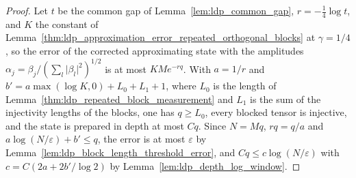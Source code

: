 \begin{proof}
    \leanok
    Let $t$ be the common gap of Lemma~\ref{lem:ldp_common_gap}, $r=-\tfrac14\log t$,
    and $K$ the constant of
    Lemma~\ref{thm:ldp_approximation_error_repeated_orthogonal_blocks} at
    $\gamma=1/4$, so the error of the corrected approximating state with the
    amplitudes $\alpha_j=\beta_j/(\sum_l\lvert\beta_l\rvert^2)^{1/2}$ is at most
    $KMe^{-rq}$. With $a=1/r$ and $b'=a\max(\log K,0)+L_0+L_1+1$, where $L_0$ is the
    length of Lemma~\ref{thm:ldp_repeated_block_measurement} and $L_1$ is the sum
    of the injectivity lengths of the blocks, one has $q\geq L_0$, every blocked
    tensor is injective, and the state is prepared in depth at most $Cq$. Since
    $N=Mq$, $rq=q/a$ and $a\log(N/\varepsilon)+b'\leq q$, the error is at most
    $\varepsilon$ by Lemma~\ref{lem:ldp_block_length_threshold_error}, and
    $Cq\leq c\log(N/\varepsilon)$ with $c=C(2a+2b'/\log2)$ by
    Lemma~\ref{lem:ldp_depth_log_window}.
\end{proof}

